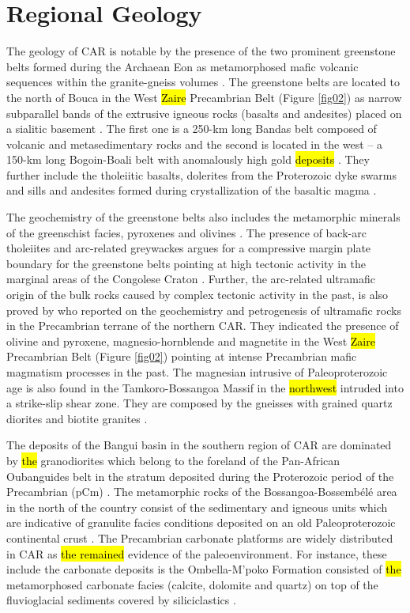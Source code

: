 \documentclass[minerals,article,submit,pdftex,moreauthors]{Definitions/mdpi}
\begin{document}
\section{Regional Geology} 

The geology of CAR is notable by the presence of the two prominent greenstone belts formed during the Archaean Eon as  metamorphosed mafic volcanic sequences within the granite-gneiss volumes \cite{Poidevin1991LesCD}. The greenstone belts are located to the north of Bouca in the West \hl{Zaire} Precambrian Belt (Figure \ref{fig02}) as narrow subparallel bands of the extrusive igneous rocks (basalts and andesites) placed on a sialitic basement \cite{Boulvert1983}. The first one is a 250-km long Bandas belt composed of volcanic and metasedimentary rocks \cite{POIDEVIN1981157} and the second is located in the west -- a 150-km long Bogoin-Boali belt with anomalously high gold \hl{deposits} \cite{Dostal}. They further include the tholeiitic basalts, dolerites from the Proterozoic dyke swarms and sills and andesites formed during crystallization of the basaltic magma \cite{Poidevin1985}. 

The geochemistry of the greenstone belts also includes the metamorphic minerals of the greenschist facies, pyroxenes and olivines \cite{POIDEVIN199497}. The presence of back-arc tholeiites and arc-related greywackes argues for a compressive margin plate boundary for the greenstone belts pointing at high tectonic activity in the marginal areas of the Congolese Craton \cite{cornacchia1989existence}. Further, the arc-related ultramafic origin of the bulk rocks caused by complex tectonic activity in the past, is also proved by \cite{Tanko} who reported on the geochemistry and petrogenesis of ultramafic rocks in the Precambrian terrane of the northern CAR. They indicated the presence of olivine and pyroxene, magnesio-hornblende and magnetite in the\hl{ }West \hl{Zaire} Precambrian Belt (Figure \ref{fig02}) pointing at intense Precambrian mafic magmatism processes in the past. The magnesian intrusive of Paleoproterozoic age is also found in the Tamkoro-Bossangoa Massif in the \hl{northwest} intruded into a strike-slip shear zone. They are composed by the gneisses with grained quartz diorites and biotite granites \cite{jgg2014243}.

The deposits of the Bangui basin in the southern region of CAR are dominated by \hl{the }granodiorites which belong to the foreland of the Pan-African Oubanguides belt in the stratum deposited during the Proterozoic period of the Precambrian (pCm) \cite{POIDEVIN1986581}. The metamorphic rocks of the Bossangoa-Bossembélé area in the north of the country consist of the sedimentary and igneous units which are indicative of granulite facies conditions deposited on an old Paleoproterozoic continental crust \cite{Tankoetal2021,Gerard}. The Precambrian carbonate platforms are widely distributed in CAR as \hl{the remained} evidence of the paleoenvironment. For instance, these include the carbonate deposits is the Ombella-M'poko Formation consisted of \hl{the }metamorphosed carbonate facies (calcite, dolomite and quartz) on top of the fluvioglacial sediments covered by siliciclastics \cite{TOYAMA2019108}. 
\end{document}
